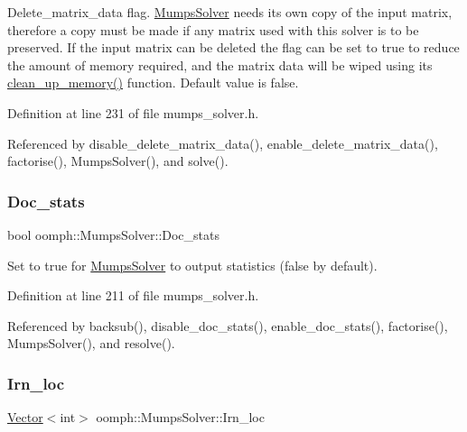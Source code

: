 Delete\+\_\+matrix\+\_\+data flag. \hyperlink{classoomph_1_1MumpsSolver}{Mumps\+Solver} needs its own copy of the input matrix, therefore a copy must be made if any matrix used with this solver is to be preserved. If the input matrix can be deleted the flag can be set to true to reduce the amount of memory required, and the matrix data will be wiped using its \hyperlink{classoomph_1_1MumpsSolver_adc1541e4a9cbbe9c641f988380618713}{clean\+\_\+up\+\_\+memory()} function. Default value is false. 



Definition at line 231 of file mumps\+\_\+solver.\+h.



Referenced by disable\+\_\+delete\+\_\+matrix\+\_\+data(), enable\+\_\+delete\+\_\+matrix\+\_\+data(), factorise(), Mumps\+Solver(), and solve().

\mbox{\label{classoomph_1_1MumpsSolver_a8dc51b4b7e2b121773aea1ed7820ea16}} 
\subsubsection{\texorpdfstring{Doc\+\_\+stats}{Doc\_stats}}
{\footnotesize\ttfamily bool oomph\+::\+Mumps\+Solver\+::\+Doc\+\_\+stats\hspace{0.3cm}{\ttfamily [private]}}



Set to true for \hyperlink{classoomph_1_1MumpsSolver}{Mumps\+Solver} to output statistics (false by default). 



Definition at line 211 of file mumps\+\_\+solver.\+h.



Referenced by backsub(), disable\+\_\+doc\+\_\+stats(), enable\+\_\+doc\+\_\+stats(), factorise(), Mumps\+Solver(), and resolve().

\mbox{\label{classoomph_1_1MumpsSolver_a969c7e01bcce31a946e01f03953e0745}} 
\subsubsection{\texorpdfstring{Irn\+\_\+loc}{Irn\_loc}}
{\footnotesize\ttfamily \hyperlink{classoomph_1_1Vector}{Vector}$<$int$>$ oomph\+::\+Mumps\+Solver\+::\+Irn\+\_\+loc\hspace{0.3cm}{\ttfamily [private]}}




